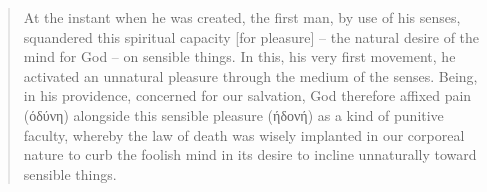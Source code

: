 \begin{quote}
	At the instant when he was created, the first man, by use of his senses, squandered this spiritual capacity [for pleasure] -- the natural desire of the mind for God -- on sensible things. In this, his very first movement, he activated an unnatural pleasure through the medium of the senses. Being, in his providence, concerned for our salvation, God therefore affixed pain (όδύνη) alongside this sensible pleasure (ήδονή) as a kind of punitive faculty, whereby the law of death was wisely implanted in our corporeal nature to curb the foolish mind in its desire to incline unnaturally toward sensible things.
\end{quote}